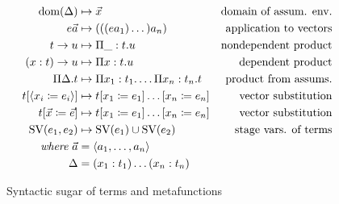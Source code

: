 \begin{figure}
\begin{align*}
\text{dom}(\Delta) &\mapsto \vec{x}                               &\text{domain of assum. env.} \\
e \vec{a}    &\mapsto (((e a_1) \dots) a_n)                 &\text{application to vectors} \\
t \to u      &\mapsto \Pi\_: t. u                           &\text{nondependent product} \\
(x: t) \to u &\mapsto \Pi x: t. u                           &\text{dependent product} \\
\Pi\Delta.t  &\mapsto \Pi x_1: t_1. \dots \Pi x_n: t_n. t   &\text{product from assums.} \\
t[\langle x_i \coloneqq e_i \rangle] &\mapsto t[x_1 \coloneqq e_1]\dots[x_n \coloneqq e_n] &\text{vector substitution} \\
t[\vec{x} \coloneqq \vec{e}]         &\mapsto t[x_1 \coloneqq e_1]\dots[x_n \coloneqq e_n] &\text{vector substitution} \\
\text{SV}(e_1, e_2) &\mapsto \text{SV}(e_1) \cup \text{SV}(e_2)               &\text{stage vars. of terms} \\
\textit{where}\ \vec{a} &= \langle a_1, \dots, a_n \rangle  \\
\Delta  &= (x_1: t_1) \dots (x_n: t_n)
\end{align*}
\caption{Syntactic sugar of terms and metafunctions}
\label{fig:sugar}
\end{figure}